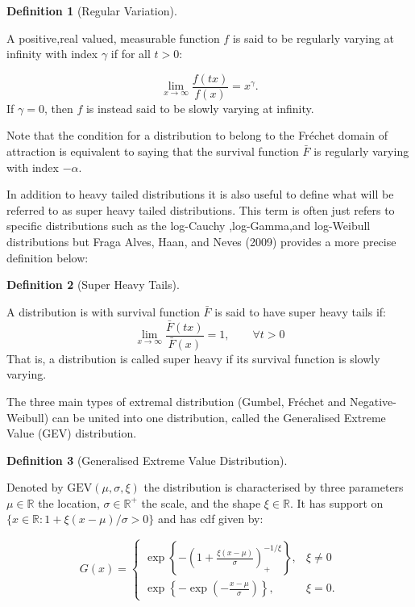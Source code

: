 \documentclass[
  10pt,
  a4paper,
]{scrreprt}
\theoremstyle{plain}
\theoremstyle{definition}
\newtheorem{definition}{Definition}[section]
\theoremstyle{remark}
\begin{document}
{\begin{definition}[Regular
Variation]\protect\hypertarget{def-rv}{}\label{def-rv}

A positive,real valued, measurable function \(f\) is said to be
regularly varying at infinity with index \(\gamma\) if for all \(t>0\):

\[
\lim_{x\rightarrow\infty}\displaystyle\frac{f(tx)}{f(x)} = x^{\gamma}.
\] If \(\gamma =0\), then \(f\) is instead said to be slowly varying at
infinity.

\end{definition}

Note that the condition for a distribution to belong to the Fréchet
domain of attraction is equivalent to saying that the survival function
\(\bar F\) is regularly varying with index \(-\alpha\).

In addition to heavy tailed distributions it is also useful to define
what will be referred to as super heavy tailed distributions. This term
is often just refers to specific distributions such as the log-Cauchy
,log-Gamma,and log-Weibull distributions but Fraga Alves, Haan, and
Neves (2009) provides a more precise definition below:

\begin{definition}[Super Heavy
Tails]\protect\hypertarget{def-sup}{}\label{def-sup}

A distribution is with survival function \(\bar F\) is said to have
super heavy tails if: \[
\lim_{x\rightarrow\infty}\displaystyle\frac{\bar F(tx)}{\bar F (x)} = 1,\qquad \forall t>0
\] That is, a distribution is called super heavy if its survival
function is slowly varying.

\end{definition}

The three main types of extremal distribution (Gumbel, Fréchet and
Negative-Weibull) can be united into one distribution, called the
Generalised Extreme Value (GEV) distribution.

\begin{definition}[Generalised Extreme Value
Distribution]\protect\hypertarget{def-gev}{}\label{def-gev}

Denoted by \(\text{GEV}(\mu,\sigma,\xi)\) the distribution is
characterised by three parameters \(\mu \in \mathbb R\) the location,
\(\sigma\in \mathbb R^+\) the scale, and the shape \(\xi\in \mathbb R\).
It has support on \(\{x\in \mathbb R:1+\xi(x-\mu)/\sigma > 0\}\) and has
cdf given by:

\[
G(x) = \begin{cases}\exp\left\{-\left(1+\displaystyle\frac{\xi(x-\mu)}{\sigma}\right)_+^{-1/\xi}\right\},&\xi\ne0\\
\exp\left\{-\exp\left(-\displaystyle\frac{x-\mu}{\sigma}\right)\right\},&\xi=0.
\end{cases}
\]


\end{definition}}
\end{document}
